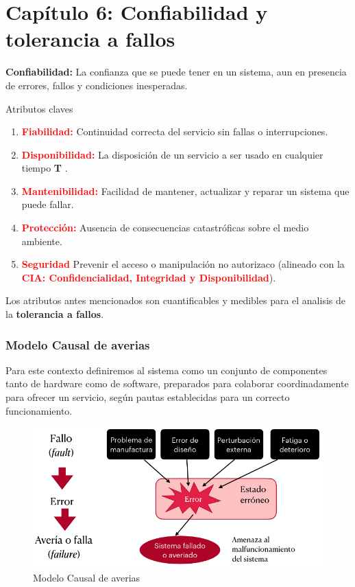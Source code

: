 \section{Capítulo 6: Confiabilidad y tolerancia a fallos}

\textbf{Confiabilidad:} La confianza que se puede tener en un sistema, aun en presencia de errores, fallos y condiciones inesperadas.

Atributos claves

\begin{enumerate}
    \item \textcolor{red}{\textbf{Fiabilidad:}} Continuidad correcta del servicio sin fallas o interrupciones.
    \item \textcolor{red}{\textbf{Disponibilidad:}} La disposición de un servicio a ser usado en cualquier tiempo \textbf{T} .
    \item \textcolor{red}{\textbf{Mantenibilidad:}} Facilidad de mantener, actualizar y reparar un sistema que puede fallar.
    \item \textcolor{red}{\textbf{Protección:}} Ausencia de consecuencias catastróficas sobre el medio ambiente.
    \item \textcolor{red}{\textbf{Seguridad}} Prevenir el acceso o manipulación no autorizaco (alineado con la \textcolor{red}{\textbf{CIA: Confidencialidad, Integridad y Disponibilidad}}).
\end{enumerate}

Los atributos antes mencionados son cuantificables y medibles para el analisis de la \textbf{tolerancia a fallos}.

\subsubsection{Modelo Causal de averias}
Para este contexto definiremos al sistema como un conjunto de componentes tanto de hardware como de software, preparados para colaborar coordinadamente para ofrecer un servicio, según pautas establecidas para un correcto funcionamiento.

\begin{figure}[H]
    \centering
    \includegraphics[width=0.48\linewidth]{img/Modelo_Causal_de_averias.png}
    \caption{Modelo Causal de averias}\label{fig:1761579857293}
\end{figure}

